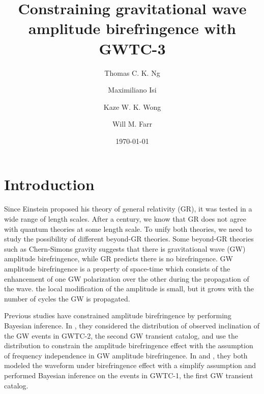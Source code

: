 \documentclass[reprint,amsmath,amssymb,aps,twocolumn]{aastex631}
\begin{document}
\title{Constraining gravitational wave amplitude birefringence with GWTC-3}

\author{Thomas C. K. Ng}

\author{Maximiliano Isi}

\author{Kaze W. K. Wong}

\author{Will M. Farr}

\date{\today}

\begin{abstract}

\end{abstract}

\section{Introduction}
\label{sec:Introduction}

Since Einstein proposed his theory of general relativity (GR), it was tested in a wide range of length scales.
After a century, we know that GR does not agree with quantum theories at some length scale.
To unify both theories, we need to study the possibility of different beyond-GR theories.
Some beyond-GR theories such as Chern-Simons gravity suggests that there is gravitational wave (GW) amplitude birefringence, while GR predicts there is no birefringence.
GW amplitude birefringence is a property of space-time which consists of the enhancement of one GW polarization over the other during the propagation of the wave.
the local modification of the amplitude is small, but it grows with the number of cycles the GW is propagated.

Previous studies have constrained amplitude birefringence by performing Bayesian inference.
In \citet{Maria_2021}, they considered the distribution of observed inclination of the GW events in GWTC-2, the second GW transient catalog, and use the distribution to constrain the amplitude birefringence effect with the assumption of frequency independence in GW amplitude birefringence.
In \citet{Yamada_2020} and \citet{Wang_2021}, they both modeled the waveform under birefringence effect with a simplify assumption and performed Bayesian inference on the events in GWTC-1, the first GW transient catalog.
\end{document}
